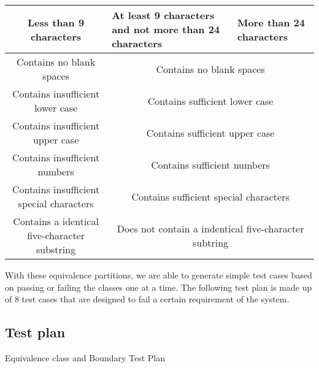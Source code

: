 \documentclass[12pt,letterpaper]{article}
\begin{document}
\begin{center}

    
  \begin{tabular}{||c|m{4cm}|m{5cm}||}
  \hline
  Less than 9 characters & At least 9 characters and not more than 24
  characters & More than 24 characters \\
  
  \hline \hline
  \multicolumn{1}{||c|}{Contains no blank spaces} & \multicolumn{2}{c||}{Contains no blank spaces} \\
  
  \hline \hline
  \multicolumn{1}{||c|}{Contains insufficient lower case} 
  & \multicolumn{2}{c||}{Contains sufficient lower case} \\
    
  \hline \hline
  \multicolumn{1}{||c|}{Contains insufficient upper case} 
  & \multicolumn{2}{c||}{Contains sufficient upper case} \\
  
  \hline \hline
  \multicolumn{1}{||c|}{Contains insufficient numbers} 
  & \multicolumn{2}{c||}{Contains sufficient numbers} \\
    
  \hline \hline
  \multicolumn{1}{||c|}{Contains insufficient special characters} 
  & \multicolumn{2}{c||}{Contains sufficient special characters} \\
  
  \hline \hline
  \multicolumn{1}{||c|}{Contains a identical five-character substring}
  & \multicolumn{2}{c||}{Does not contain a indentical five-character subtring} \\
  \hline
  \end{tabular}
\end{center}


With these equivalence partitions, we are able to generate simple test cases
based on passing or failing the classes one at a time. The following test plan
is made up of 8 test cases that are designed to fail a certain requirement of
the system.
\newline


\subsection{Test plan}

\centering Equivalence class and Boundary Test Plan
\end{document}
